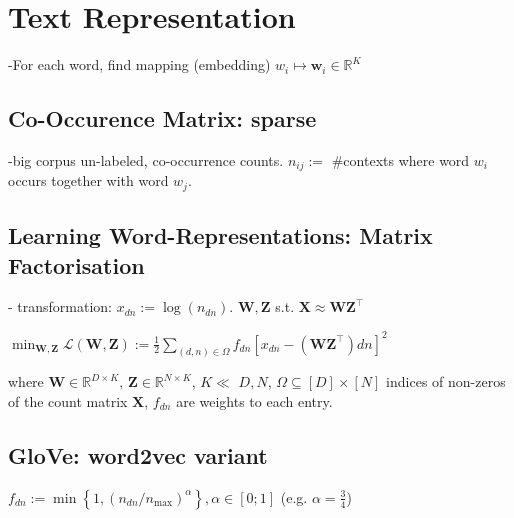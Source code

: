 \section{Text Representation}


-For each word, find mapping (embedding) $w_{i} \mapsto \mathbf{w}_{i} \in \mathbb{R}^{K}$

\subsection*{Co-Occurence Matrix: sparse}

-big corpus un-labeled, co-occurrence counts. $n_{i j}:=$ \#contexts where word $w_{i}$ occurs together with word $w_{j}$.



\subsection*{Learning Word-Representations: Matrix Factorisation}


- transformation: $x_{d n}:=\log \left(n_{d n}\right)$.
$\mathbf{W}, \mathbf{Z}$ s.t. $
\mathbf{X} \approx \mathbf{W} \mathbf{Z}^{\top}
$

$
\min _{\mathbf{W}, \mathbf{Z}} \mathcal{L}(\mathbf{W}, \mathbf{Z}):=\frac{1}{2} \sum_{(d, n) \in \Omega} f_{d n}\left[x_{d n}-\left(\mathbf{W} \mathbf{Z}^{\top}\right) d n\right]^{2}
$

where $\mathbf{W} \in \mathbb{R}^{D \times K}$, $\mathbf{Z} \in \mathbb{R}^{N \times K}$, $K \ll$ $D, N$, $\Omega \subseteq[D] \times[N]$ indices of non-zeros of the count matrix $\mathbf{X}$, $f_{d n}$ are weights to each entry.

\subsection*{GloVe: word2vec variant}
$f_{d n}:=\min \left\{1,\left(n_{d n} / n_{\max }\right)^{\alpha}\right\}, \alpha \in[0 ; 1]$ (e.g. $\alpha=\frac{3}{4}$)

